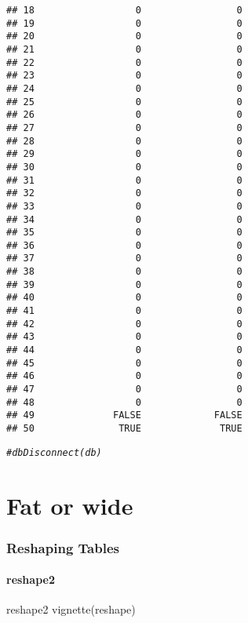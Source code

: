 \documentclass[12pt]{beamer}\usepackage[]{graphicx}\usepackage[]{color}
\makeatletter
\newcommand{\hlcom}[1]{\textcolor[rgb]{0.678,0.584,0.686}{\textit{#1}}}%
\newenvironment{kframe}{%
 \def\at@end@of@kframe{}%
 \ifinner\ifhmode%
  \def\at@end@of@kframe{\end{minipage}}%
  \begin{minipage}{\columnwidth}%
 \fi\fi%
 \def\FrameCommand##1{\hskip\@totalleftmargin \hskip-\fboxsep
 \colorbox{shadecolor}{##1}\hskip-\fboxsep
     \hskip-\linewidth \hskip-\@totalleftmargin \hskip\columnwidth}%
 \MakeFramed {\advance\hsize-\width
   \@totalleftmargin\z@ \linewidth\hsize
   \@setminipage}}%
 {\par\unskip\endMakeFramed%
 \at@end@of@kframe}
\newenvironment{knitrout}{}{} %
\makeatother
\begin{document}
\begin{frame}[fragile]
\begin{knitrout}
\begin{kframe}
\begin{verbatim}
## 18                  0                 0
## 19                  0                 0
## 20                  0                 0
## 21                  0                 0
## 22                  0                 0
## 23                  0                 0
## 24                  0                 0
## 25                  0                 0
## 26                  0                 0
## 27                  0                 0
## 28                  0                 0
## 29                  0                 0
## 30                  0                 0
## 31                  0                 0
## 32                  0                 0
## 33                  0                 0
## 34                  0                 0
## 35                  0                 0
## 36                  0                 0
## 37                  0                 0
## 38                  0                 0
## 39                  0                 0
## 40                  0                 0
## 41                  0                 0
## 42                  0                 0
## 43                  0                 0
## 44                  0                 0
## 45                  0                 0
## 46                  0                 0
## 47                  0                 0
## 48                  0                 0
## 49              FALSE             FALSE
## 50               TRUE              TRUE
\end{verbatim}
\begin{alltt}
\hlcom{#dbDisconnect(db)}
\end{alltt}
\end{kframe}
\end{knitrout}
               



\end{frame}

\section*{Fat or wide}
\begin{frame}[fragile]
  \frametitle{Reshaping Tables}
  \framesubtitle{reshape2}
  \begin{block}{reshape2}
  vignette(reshape)
  \end{block}
\end{frame}  
\end{document}
